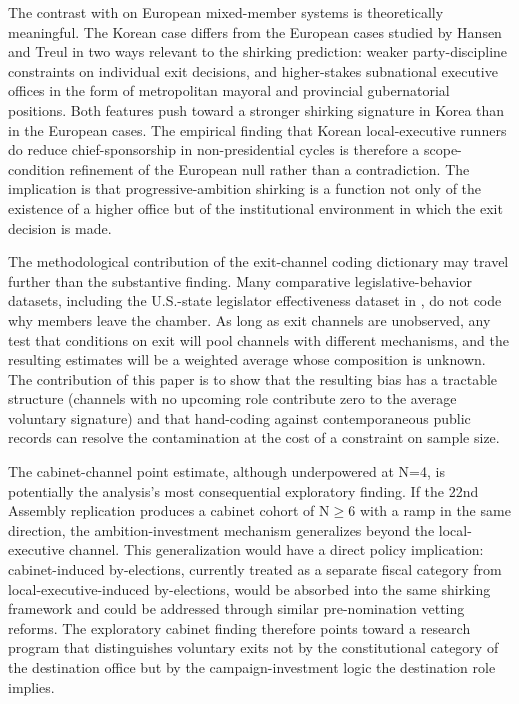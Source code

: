 \documentclass[11pt]{article}
\begin{document}
The contrast with \citet{hansen2015} on European mixed-member systems is theoretically meaningful. The Korean case differs from the European cases studied by Hansen and Treul in two ways relevant to the shirking prediction: weaker party-discipline constraints on individual exit decisions, and higher-stakes subnational executive offices in the form of metropolitan mayoral and provincial gubernatorial positions. Both features push toward a stronger shirking signature in Korea than in the European cases. The empirical finding that Korean local-executive runners do reduce chief-sponsorship in non-presidential cycles is therefore a scope-condition refinement of the European null rather than a contradiction. The implication is that progressive-ambition shirking is a function not only of the existence of a higher office but of the institutional environment in which the exit decision is made.

The methodological contribution of the exit-channel coding dictionary may travel further than the substantive finding. Many comparative legislative-behavior datasets, including the U.S.-state legislator effectiveness dataset in \citet{volden2024}, do not code why members leave the chamber. As long as exit channels are unobserved, any test that conditions on exit will pool channels with different mechanisms, and the resulting estimates will be a weighted average whose composition is unknown. The contribution of this paper is to show that the resulting bias has a tractable structure (channels with no upcoming role contribute zero to the average voluntary signature) and that hand-coding against contemporaneous public records can resolve the contamination at the cost of a constraint on sample size.

The cabinet-channel point estimate, although underpowered at N=4, is potentially the analysis's most consequential exploratory finding. If the 22nd Assembly replication produces a cabinet cohort of N$\geq$6 with a ramp in the same direction, the ambition-investment mechanism generalizes beyond the local-executive channel. This generalization would have a direct policy implication: cabinet-induced by-elections, currently treated as a separate fiscal category from local-executive-induced by-elections, would be absorbed into the same shirking framework and could be addressed through similar pre-nomination vetting reforms. The exploratory cabinet finding therefore points toward a research program that distinguishes voluntary exits not by the constitutional category of the destination office but by the campaign-investment logic the destination role implies.
\end{document}
